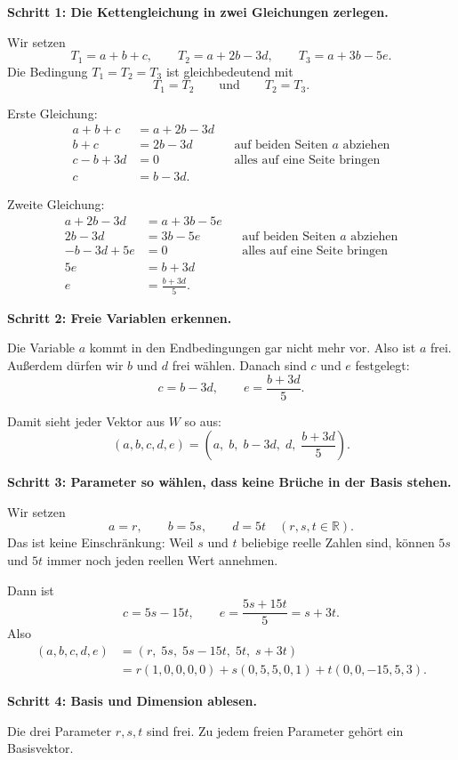 \documentclass[a4paper,12pt]{article}
\begin{document}
\textbf{Schritt 1: Die Kettengleichung in zwei Gleichungen zerlegen.}

Wir setzen
\[
T_1=a+b+c,\qquad T_2=a+2b-3d,\qquad T_3=a+3b-5e.
\]
Die Bedingung $T_1=T_2=T_3$ ist gleichbedeutend mit
\[
T_1=T_2
\qquad\text{und}\qquad
T_2=T_3.
\]

Erste Gleichung:
\begin{align*}
a+b+c &= a+2b-3d \\
b+c &= 2b-3d && \text{auf beiden Seiten $a$ abziehen} \\
c-b+3d &= 0 && \text{alles auf eine Seite bringen} \\
c &= b-3d.
\end{align*}

Zweite Gleichung:
\begin{align*}
a+2b-3d &= a+3b-5e \\
2b-3d &= 3b-5e && \text{auf beiden Seiten $a$ abziehen} \\
-b-3d+5e &= 0 && \text{alles auf eine Seite bringen} \\
5e &= b+3d \\
e &= \frac{b+3d}{5}.
\end{align*}

\textbf{Schritt 2: Freie Variablen erkennen.}

Die Variable $a$ kommt in den Endbedingungen gar nicht mehr vor. Also ist $a$ frei.
Au\ss erdem d\"urfen wir $b$ und $d$ frei w\"ahlen. Danach sind $c$ und $e$ festgelegt:
\[
c=b-3d,
\qquad
e=\frac{b+3d}{5}.
\]

Damit sieht jeder Vektor aus $W$ so aus:
\[
(a,b,c,d,e)
=
\left(a,\; b,\; b-3d,\; d,\; \frac{b+3d}{5}\right).
\]

\textbf{Schritt 3: Parameter so w\"ahlen, dass keine Br\"uche in der Basis stehen.}

Wir setzen
\[
a=r,\qquad b=5s,\qquad d=5t
\quad (r,s,t\in\mathbb{R}).
\]
Das ist keine Einschr\"ankung: Weil $s$ und $t$ beliebige reelle Zahlen sind, k\"onnen $5s$ und $5t$ immer noch jeden reellen Wert annehmen.

Dann ist
\[
c = 5s-15t,
\qquad
e = \frac{5s+15t}{5}=s+3t.
\]
Also
\begin{align*}
(a,b,c,d,e)
&= (r,\;5s,\;5s-15t,\;5t,\;s+3t) \\
&= r(1,0,0,0,0)
 + s(0,5,5,0,1)
 + t(0,0,-15,5,3).
\end{align*}

\textbf{Schritt 4: Basis und Dimension ablesen.}

Die drei Parameter $r,s,t$ sind frei. Zu jedem freien Parameter geh\"ort ein Basisvektor.
\end{document}
